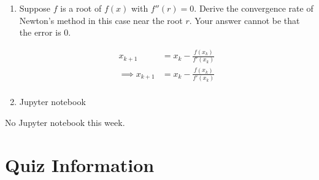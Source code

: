 \documentclass[reqno, answers]{exam}
\begin{document}
\begin{enumerate}
\begin{solution}
At $x_1 = \begin{bmatrix} -2 \\ 1 \end{bmatrix}$:
$$f(x_1) = \begin{bmatrix} -2 \\ 3 \end{bmatrix}, \quad J_f(x_1) = \begin{bmatrix} 1 & 0 \\ -3 & 2 \end{bmatrix}$$

Solve $J_f(x_1) \Delta x = -f(x_1) = \begin{bmatrix} 2 \\ -3 \end{bmatrix}$:

From row 1: $\Delta x_1 = 2$. From row 2: $\Delta x_2 = \frac{3}{2}$.

Therefore:
$$\boxed{x_2 = \begin{bmatrix} -2 \\ 1 \end{bmatrix} + \begin{bmatrix} 2 \\ 3/2 \end{bmatrix} = \begin{bmatrix} 0 \\ 5/2 \end{bmatrix}}$$
\end{solution}

\item Suppose $f$ is a root of $f(x)$ with $f''(r) = 0$. Derive the convergence rate of Newton's method in this case near the root $r$. Your answer cannot be that the error is 0.

\begin{solution}
\begin{align*}
    x_{k+1} &= x_k - \frac{f(x_k)}{f'(x_k)} \\
    \implies 
    x_{k+1} &= x_k - \frac{f(x_k)}{f'(x_k)} \\
\end{align*}

\end{solution}

\item Jupyter notebook

\end{enumerate}

No Jupyter notebook this week.



\section*{Quiz Information}
\end{document}
